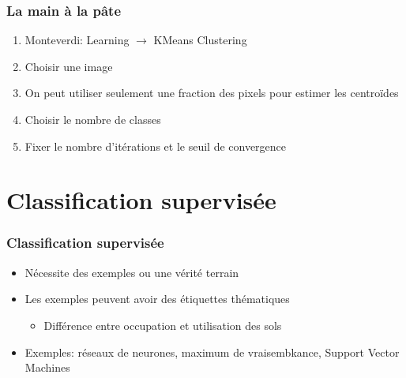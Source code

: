 \documentclass[compress]{beamer}
\begin{document}
\begin{frame}
  \frametitle{La main à la pâte}
  \begin{enumerate}
  \item Monteverdi: Learning $\rightarrow$ KMeans Clustering
  \item Choisir une image
  \item On peut utiliser seulement une fraction des pixels pour
    estimer les centroïdes
  \item Choisir le nombre de classes
  \item Fixer le nombre d'itérations et le seuil de convergence
  \end{enumerate}    
\end{frame}
\section[Supervisé]{Classification supervisée}
\label{sec:supervised}
\begin{frame}
  \frametitle{Classification supervisée}
  \begin{itemize}
  \item Nécessite des exemples ou une vérité terrain
  \item Les exemples peuvent avoir des étiquettes thématiques
    \begin{itemize}
    \item Différence entre occupation et utilisation des sols
    \end{itemize}
  \item Exemples: réseaux de neurones, maximum de vraisembkance, Support Vector Machines
  \end{itemize}
\end{frame}
\end{document}
